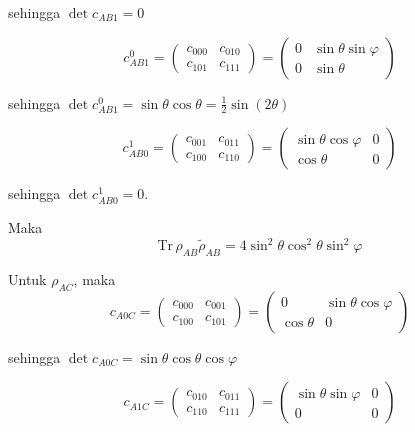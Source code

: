 sehingga $\det c_{AB1} = 0$

\begin{equation}
	c_{AB1}^0=
	\begin{pmatrix}
		c_{000} & c_{010} \\
		c_{101} & c_{111}
	\end{pmatrix}=
	\begin{pmatrix}
		0 & \sin\theta\sin\varphi \\
		0 & \sin\theta
	\end{pmatrix}
\end{equation}

sehingga $\det c_{AB1}^0 = \sin\theta \cos\theta = \frac{1}{2}\sin(2\theta)$

\begin{equation}
	c_{AB0}^1=
	\begin{pmatrix}
		c_{001} & c_{011} \\
		c_{100} & c_{110}
	\end{pmatrix}=
	\begin{pmatrix}
		\sin\theta\cos\varphi & 0 \\
		\cos\theta & 0
	\end{pmatrix}
\end{equation}

sehingga $\det c_{AB0}^1 = 0$.

Maka
\begin{equation}
	\mathrm{Tr}\,\rho_{AB}\tilde{\rho}_{AB}=4\sin^2\theta \cos^2\theta \sin^2\varphi	
\end{equation}

Untuk $\rho_{AC}$, maka
\begin{equation}
	c_{A0C}=
	\begin{pmatrix}
		c_{000} & c_{001} \\
		c_{100} & c_{101}
	\end{pmatrix}=
	\begin{pmatrix}
		0 & \sin\theta\cos\varphi \\
		\cos\theta & 0
	\end{pmatrix}
\end{equation}

sehingga $\det c_{A0C} = \sin\theta\cos\theta\cos\varphi$

\begin{equation}
	c_{A1C}=
	\begin{pmatrix}
		c_{010} & c_{011} \\
		c_{110} & c_{111}
	\end{pmatrix}=
	\begin{pmatrix}
		\sin\theta\sin\varphi & 0 \\
		0 & 0
	\end{pmatrix}
\end{equation}

